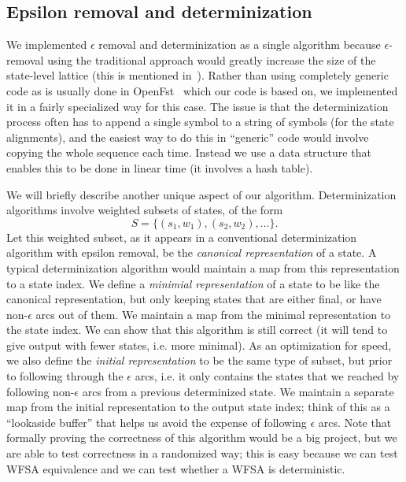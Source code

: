 \documentclass{article}
\begin{document}
\subsection{Epsilon removal and determinization}

We implemented $\epsilon$ removal and determinization as a single algorithm 
because $\epsilon$-removal using the traditional approach would greatly
increase the size of the state-level lattice (this is mentioned 
in~\cite{efficient_general}).  Rather than using completely generic
code as is usually done in OpenFst~\cite{openfst} which our code is based on,
we implemented it in a fairly specialized way for this case.  The issue
is that the determinization process often has to append a single symbol to
a string of symbols (for the state alignments), and the easiest way to
do this in ``generic'' code would involve copying the whole sequence each time.
Instead we use a data structure that enables this to be done in linear
time (it involves a hash table).  

We will briefly describe another unique aspect of our
algorithm.  Determinization algorithms involve weighted subsets of states,
of the form
\begin{equation}
   S = \{ (s_1, w_1), (s_2, w_2), \ldots \} .
\end{equation}
Let this weighted subset, as it appears in a conventional determinization
algorithm with epsilon removal, be the {\em canonical representation} of a state.
A typical determinization algorithm would maintain a map from this representation
to a state index.  We define a {\em minimial representation} of a state
to be like the canonical representation, but only keeping states that
are either final, or have non-$\epsilon$ arcs out of them.  We maintain
a map from the minimal representation to the state index.  We can
show that this algorithm is still correct (it will tend to give output
with fewer states, i.e. more minimal).  As an optimization for speed, we also define
the {\em initial representation} to be the same type of subset, but prior
to following through the $\epsilon$ arcs, i.e. it only contains the states
that we reached by following non-$\epsilon$ arcs from a previous determinized
state.  We maintain a separate map from the initial representation to
the output state index; think of this as a ``lookaside buffer'' that helps us
avoid the expense of following $\epsilon$ arcs.  Note that formally
proving the correctness of this algorithm would be a big project, but we
are able to test correctness in a randomized way; this is easy because we
can test WFSA equivalence and we can test whether a WFSA is deterministic.
\end{document}
